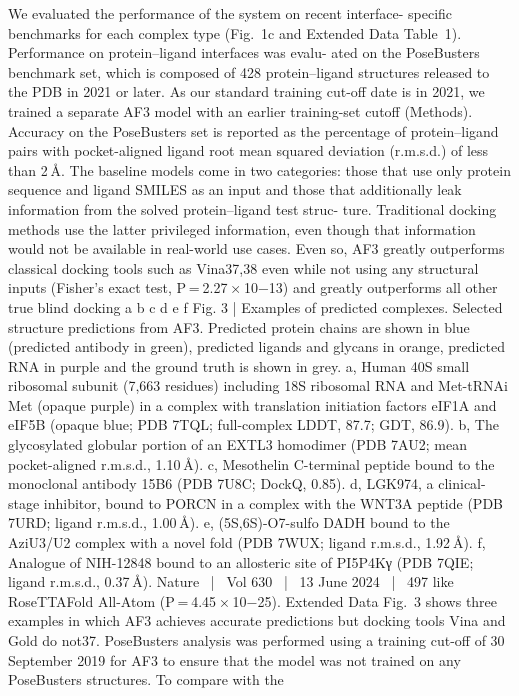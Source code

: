 We evaluated the performance of the system on recent interface-
specific benchmarks for each complex type (Fig. 1c and Extended
Data Table 1). Performance on protein–ligand interfaces was evalu-
ated on the PoseBusters benchmark set, which is composed of 428
protein–ligand structures released to the PDB in 2021 or later. As our
standard training cut-off date is in 2021, we trained a separate AF3
model with an earlier training-set cutoff (Methods). Accuracy on the
PoseBusters set is reported as the percentage of protein–ligand pairs
with pocket-aligned ligand root mean squared deviation (r.m.s.d.) of
less than 2 Å. The baseline models come in two categories: those that
use only protein sequence and ligand SMILES as an input and those that
additionally leak information from the solved protein–ligand test struc-
ture. Traditional docking methods use the latter privileged information,
even though that information would not be available in real-world use
cases. Even so, AF3 greatly outperforms classical docking tools such as
Vina37,38 even while not using any structural inputs (Fisher’s exact test,
P = 2.27 × 10−13) and greatly outperforms all other true blind docking
a
b
c
d
e
f
Fig. 3 | Examples of predicted complexes. Selected structure predictions
from AF3. Predicted protein chains are shown in blue (predicted antibody in
green), predicted ligands and glycans in orange, predicted RNA in purple and
the ground truth is shown in grey. a, Human 40S small ribosomal subunit (7,663
residues) including 18S ribosomal RNA and Met-tRNAi
Met (opaque purple) in a
complex with translation initiation factors eIF1A and eIF5B (opaque blue; PDB
7TQL; full-complex LDDT, 87.7; GDT, 86.9). b, The glycosylated globular portion
of an EXTL3 homodimer (PDB 7AU2; mean pocket-aligned r.m.s.d., 1.10 Å).
c, Mesothelin C-terminal peptide bound to the monoclonal antibody 15B6
(PDB 7U8C; DockQ, 0.85). d, LGK974, a clinical-stage inhibitor, bound to
PORCN in a complex with the WNT3A peptide (PDB 7URD; ligand r.m.s.d.,
1.00 Å). e, (5S,6S)-O7-sulfo DADH bound to the AziU3/U2 complex with a novel
fold (PDB 7WUX; ligand r.m.s.d., 1.92 Å). f, Analogue of NIH-12848 bound to an
allosteric site of PI5P4Kγ (PDB 7QIE; ligand r.m.s.d., 0.37 Å).
Nature  |  Vol 630  |  13 June 2024  |  497
like RoseTTAFold All-Atom (P = 4.45 × 10−25). Extended Data Fig. 3 shows
three examples in which AF3 achieves accurate predictions but docking
tools Vina and Gold do not37. PoseBusters analysis was performed using
a training cut-off of 30 September 2019 for AF3 to ensure that the model
was not trained on any PoseBusters structures. To compare with the
